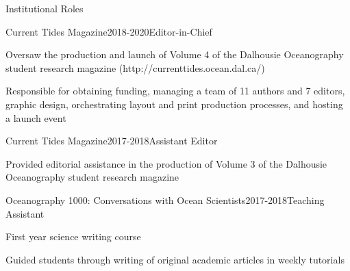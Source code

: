 \documentclass{resume} %
\begin{document}
\begin{rSection}{Institutional Roles}
	
	\begin{rSubsection}{Current Tides Magazine}{2018-2020}{Editor-in-Chief}{}
		\item Oversaw the production and launch of Volume 4 of the Dalhousie Oceanography student research magazine (http://currenttides.ocean.dal.ca/)
		\item Responsible for obtaining funding, managing a team of 11 authors and 7 editors, graphic design, orchestrating layout and print production processes, and hosting a launch event
	\end{rSubsection}
	
	\begin{rSubsection}{Current Tides Magazine}{2017-2018}{Assistant Editor}{}
		\item Provided editorial assistance in the production of Volume 3 of the Dalhousie Oceanography student research magazine
	\end{rSubsection}
	
	\begin{rSubsection}{Oceanography 1000: Conversations with Ocean Scientists}{2017-2018}{Teaching Assistant}{}
		\item First year science writing course
		\item Guided students through writing of original academic articles in weekly tutorials
	\end{rSubsection}
	
\end{rSection}



	
\end{document}
